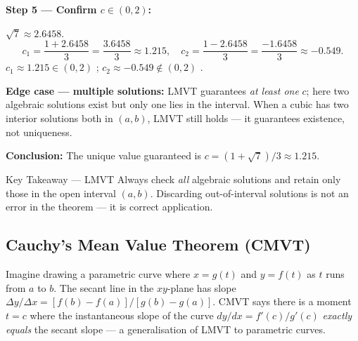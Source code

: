\documentclass[12pt,a4paper]{article}
\begin{document}
\textbf{Step 5 --- Confirm $c \in (0,2)$:}

$\sqrt{7} \approx 2.6458$.
\[
  c_1 = \frac{1 + 2.6458}{3} = \frac{3.6458}{3} \approx 1.215, \quad
  c_2 = \frac{1 - 2.6458}{3} = \frac{-1.6458}{3} \approx -0.549.
\]
$c_1 \approx 1.215 \in (0,2)$ \checkmark; \quad $c_2 \approx -0.549 \notin (0,2)$ \texttimes.

\textbf{Edge case --- multiple solutions:}
LMVT guarantees \emph{at least one} $c$; here two algebraic solutions exist but only one
lies in the interval. When a cubic has two interior solutions both in $(a,b)$, LMVT still
holds --- it guarantees existence, not uniqueness.

\textbf{Conclusion:} The unique value guaranteed is $c = (1+\sqrt{7})/3 \approx 1.215$.

\begin{learnbox}{Key Takeaway --- LMVT}
Always check \emph{all} algebraic solutions and retain only those in the open interval $(a,b)$.
Discarding out-of-interval solutions is not an error in the theorem --- it is correct application.
\end{learnbox}

\subsection{Cauchy's Mean Value Theorem (CMVT)}

Imagine drawing a parametric curve where $x = g(t)$ and $y = f(t)$ as $t$ runs from $a$ to $b$.
The secant line in the $xy$-plane has slope $\Delta y / \Delta x = [f(b)-f(a)]/[g(b)-g(a)]$.
CMVT says there is a moment $t = c$ where the instantaneous slope of the curve
$dy/dx = f'(c)/g'(c)$ \emph{exactly equals} the secant slope --- a generalisation of LMVT
to parametric curves.
\end{document}
